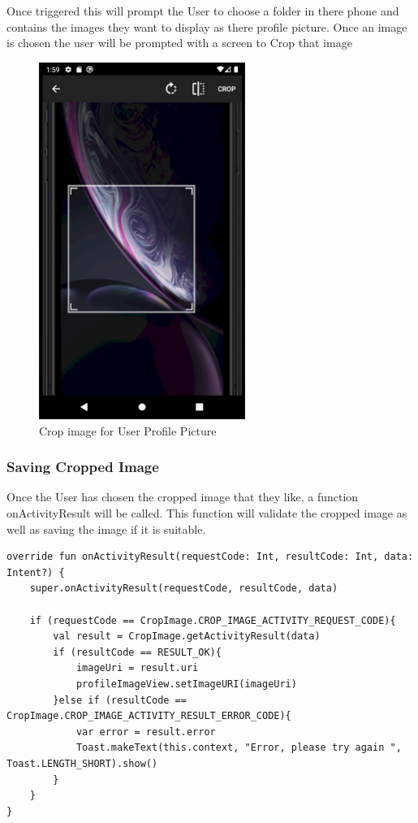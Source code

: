 Once triggered this will prompt the User to choose a folder in there phone and contains the images they want to display as there profile picture. Once an image is chosen the user will be prompted with a screen to Crop that image 
\begin{figure}[h!]
	\caption{Crop image for User Profile Picture}
	\label{cropimg}
	\centering
	\includegraphics[width=0.6\textwidth]{Images/user_crop_img.png}
\end{figure}
\newpage
\subsubsection{Saving Cropped Image}
Once the User has chosen the cropped image that they like, a function onActivityResult will be called. This function will validate the cropped image as well as saving the image if it is suitable.

\begin{verbatim}
override fun onActivityResult(requestCode: Int, resultCode: Int, data: Intent?) {
    super.onActivityResult(requestCode, resultCode, data)

    if (requestCode == CropImage.CROP_IMAGE_ACTIVITY_REQUEST_CODE){
        val result = CropImage.getActivityResult(data)
        if (resultCode == RESULT_OK){
            imageUri = result.uri
            profileImageView.setImageURI(imageUri)
        }else if (resultCode == CropImage.CROP_IMAGE_ACTIVITY_RESULT_ERROR_CODE){
            var error = result.error
            Toast.makeText(this.context, "Error, please try again ", Toast.LENGTH_SHORT).show()
        }
    }
}
\end{verbatim}
\newpage

